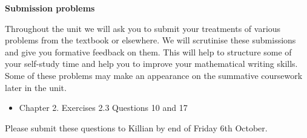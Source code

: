 \documentclass[oneside,10pt]{amsart}
\newcommand{\cbox}[1]{\begin{tcolorbox}[left=0.5mm,right=0.5mm,top=0.5mm,bottom=0.5mm, boxsep=2pt, boxrule=0pt,colback=black]\color{white}\sffamily #1 \end{tcolorbox}}
\newcommand{\topic}[1]{\cbox{\textbf{#1}}\vskip 4pt}
\begin{document}
\topic{Submission problems}
Throughout the unit we will ask you to submit your treatments of various problems from the textbook or elsewhere. We will scrutinise these submissions and give you formative feedback on them. This will help to structure some of your self-study time and help you to improve your mathematical writing skills. Some of these problems may make an appearance on the summative coursework later in the unit.
\begin{itemize}
\item
Chapter 2. Exercises 2.3 Questions 10 and 17
\end{itemize}
Please submit these questions to Killian by end of Friday 6th October.
\end{document}
